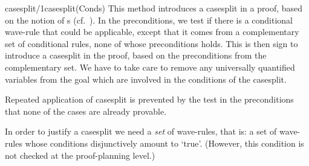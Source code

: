 \begin{method}{casesplit/1}{casesplit(Conds)}%
{\tiny
}
This method introduces a casesplit in a proof, based on the notion of
s (cf.~). In the
preconditions, we test if there is a conditional
wave-rule that could be applicable,
except that it comes from a complementary set of conditional rules,
none of whose preconditions holds. This is then sign to introduce a
casesplit in the proof, based on the preconditions from the
complementary set.  We have to take care to remove any universally
quantified variables from the goal which are involved in the
conditions of the casesplit.

Repeated application of casesplit is prevented by the test in the
preconditions that none of the cases are already provable.

In order to justify a casesplit we need a {\em {}
set\/} of wave-rules, that is: a set of wave-rules whose conditions
disjunctively amount to `true'.  (However, this condition is not
checked at the proof-planning level.)
\end{method}

